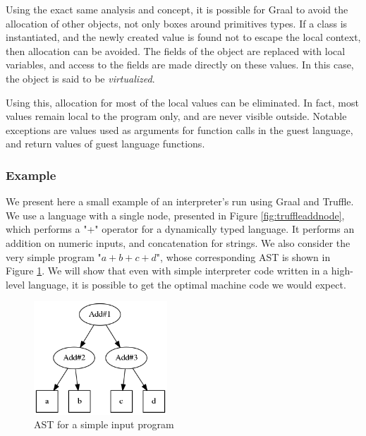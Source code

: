\documentclass[twoside,11pt,a4paper]{article}
\newcommand{\java}[1]{\textsf{#1}}
\begin{document}
Using the exact same analysis and concept, it is possible for Graal to avoid the allocation of other objects, not only boxes around primitives types. If a class is instantiated, and the newly created value is found not to escape the local context, then allocation can be avoided. The fields of the object are replaced with local variables, and access to the fields are made directly on these values. In this case, the object is said to be \textit{virtualized}.

Using this, allocation for most of the local values can be eliminated. In fact, most values remain local to the program only, and are never visible outside. Notable exceptions are values used as arguments for function calls in the guest language, and return values of guest language functions.

\subsubsection{Example}

We present here a small example of an interpreter's run using Graal and Truffle. We use a language with a single node, presented in Figure \ref{fig:truffleaddnode}, which performs a "+" operator for a dynamically typed language. It performs an addition on numeric inputs, and concatenation for strings. We also consider the very simple program "$a + b + c + d$", whose corresponding AST is shown in Figure \ref{fig:astadd}. We will show that even with simple interpreter code written in a high-level language, it is possible to get the optimal machine code we would expect.

\begin{figure}[thb]
	\centering
	\includegraphics[width=5cm]{./graphs/astadd.png}
	\caption{AST for a simple input program}
	\label{fig:astadd}
\end{figure}

%
\end{document}
